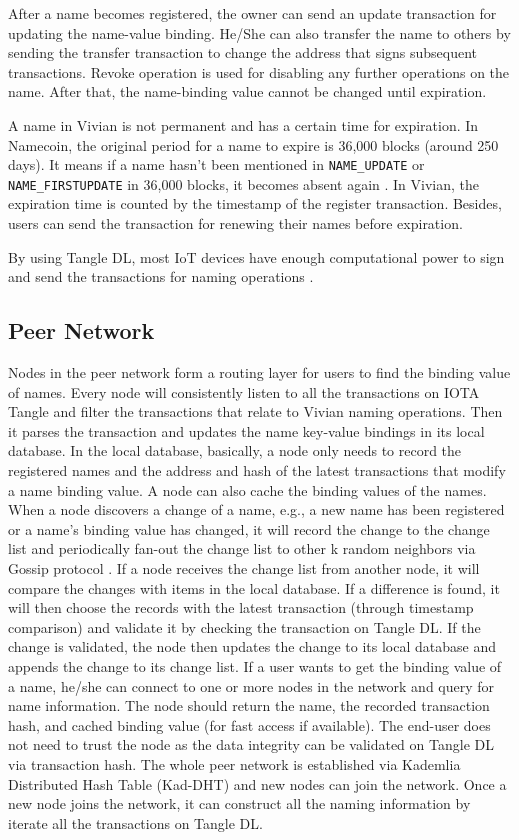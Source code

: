 After a name becomes registered, the owner can send an update transaction for updating the name-value binding. He/She can also transfer the name to others by sending the transfer transaction to change the address that signs subsequent transactions. Revoke operation is used for disabling any further operations on the name. After that, the name-binding value cannot be changed until expiration.

A name in Vivian is not permanent and has a certain time for expiration. In Namecoin, the original period for a name to expire is 36,000 blocks (around 250 days).
It means if a name hasn't been mentioned in \texttt{NAME\_UPDATE} or \texttt{NAME\_FIRSTUPDATE} in 36,000 blocks, it becomes absent again \cite{kalodner2015empirical}.
In Vivian, the expiration time is counted by the timestamp of the register transaction. Besides, users can send the transaction for renewing their names before expiration.

By using Tangle DL, most IoT devices have enough computational power to sign and send the transactions for naming operations .

\subsection{Peer Network}
Nodes in the peer network form a routing layer for users to find the binding value of names.
Every node will consistently listen to all the transactions on IOTA Tangle and filter the transactions that relate to Vivian naming operations.
Then it parses the transaction and updates the name key-value bindings in its local database.
In the local database, basically, a node only needs to record the registered names and the address and hash of the latest transactions that modify a name binding value. A node can also cache the binding values of the names.
When a node discovers a change of a name, e.g., a new name has been registered or a name's binding value has changed, it will record the change to the change list and periodically fan-out the change list to other k random neighbors via Gossip protocol \cite{10.1145/41840.41841}.
If a node receives the change list from another node, it will compare the changes with items in the local database. If a difference is found, it will then choose the records with the latest transaction (through timestamp comparison) and validate it by checking the transaction on Tangle DL. If the change is validated, the node then updates the change to its local database and appends the change to its change list.
If a user wants to get the binding value of a name, he/she can connect to one or more nodes in the network and query for name information. The node should return the name, the recorded transaction hash, and cached binding value (for fast access if available). The end-user does not need to trust the node as the data integrity can be validated on Tangle DL via transaction hash.
The whole peer network is established via Kademlia Distributed Hash Table (Kad-DHT) \cite{maymounkov2002kademlia} and new nodes can join the network. Once a new node joins the network, it can construct all the naming information by iterate all the transactions on Tangle DL.

